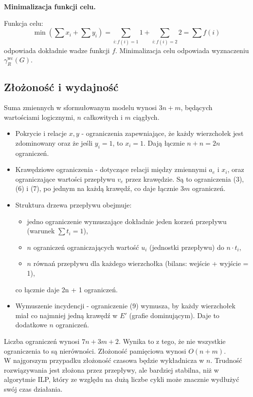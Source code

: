 \textbf{Minimalizacja funkcji celu.}

Funkcja celu:
\[
\min \left( \sum x_i + \sum y_i \right) = \sum_{i : f(i) = 1} 1 + \sum_{i : f(i) = 2} 2 = \sum f(i)
\]
odpowiada dokładnie wadze funkcji \( f \). Minimalizacja celu odpowiada wyznaczeniu \( \gamma^{\text{wc}}_R(G) \).

\subsection{Złożoność i wydajność}

Suma zmiennych w sformułowanym modelu wynosi $3n + m$, będących wartościami logicznymi, $n$ całkowitych i $m$ ciągłych.
\begin{itemize}
    \item Pokrycie i relacje \( x,y \) - ograniczenia zapewniające, że każdy wierzchołek jest zdominowany oraz że jeśli \( y_i = 1 \), to \( x_i = 1 \). Dają łącznie \( n + n = 2n \) ograniczeń.
    
    \item Krawędziowe ograniczenia - dotyczące relacji między zmiennymi \( a_e \) i \( x_i \), oraz ograniczające wartości przepływu \( v_e \) przez krawędzie. Są to ograniczenia (3), (6) i (7), po jednym na każdą krawędź, co daje łącznie $3m$ ograniczeń.
    
    \item Struktura drzewa przepływu obejmuje:
    \begin{itemize}
        \item jedno ograniczenie wymuszające dokładnie jeden korzeń przepływu\\ (warunek \( \sum t_i = 1 \)),
        \item \( n \) ograniczeń ograniczających wartość \( u_i \) (jednostki przepływu) do \( n \cdot t_i \),
        \item \( n \) równań przepływu dla każdego wierzchołka (bilans: wejście + wyjście = 1),
    \end{itemize}
    co łącznie daje 2n + 1 ograniczeń.
    
    \item Wymuszenie incydencji - ograniczenie (9) wymusza, by każdy wierzchołek miał co najmniej jedną krawędź w \( E' \) (grafie dominującym). Daje to dodatkowe $n$ ograniczeń.
\end{itemize}

\noindent
Liczba ograniczeń wynosi $7n+3m+2$. Wynika to z tego, że nie wszystkie ograniczenia to są nierówności.
Złożoność pamięciowa wynosi $O(n+m)$.\\
W najgorszym przypadku złożoność czasowa będzie wykładnicza w $n$. Trudność rozwiązywania jest złożona przez przepływy, ale bardziej stabilna, niż w algorytmie ILP, który ze względu na dużą liczbe cykli może znacznie wydłużyć swój czas działania.

